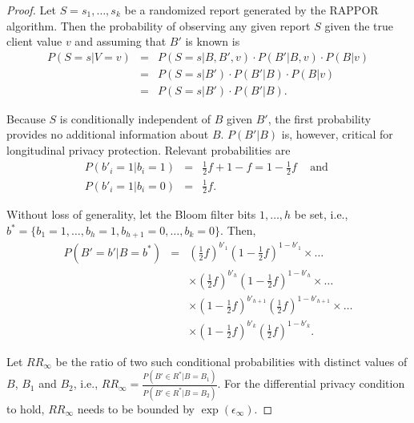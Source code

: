 \documentclass{sig-alternate-2013}
\newcommand\RAPPOR{{RAPPOR}}
\begin{document}
\begin{proof}
Let $S = s_1, \ldots, s_k$ be a randomized report generated by the \RAPPOR{} algorithm. Then the probability of observing any given report $S$ given the true client value $v$ and assuming that $B'$ is known is
\begin{eqnarray*}
P(S = s | V = v) & = & P(S = s | B, B', v)\cdot P(B' | B, v)\cdot P(B | v) \\
                         & = & P(S = s | B')\cdot P(B' | B)\cdot P(B | v) \\
                         & = & P(S = s | B')\cdot P(B' | B).
\end{eqnarray*}

Because $S$ is conditionally independent of $B$ given $B'$, the first probability provides no additional information about $B$. 
$P(B' | B)$ is, however, critical for longitudinal privacy protection. Relevant probabilities are
\begin{eqnarray*}
P(b'_i = 1 | b_i = 1) & = & \frac{1}{2}f + 1 - f = 1 - \frac{1}{2}f \;\;\;\text{~and~}\\
P(b'_i = 1 | b_i = 0) & = & \frac{1}{2}f.
\end{eqnarray*}

Without loss of generality, let the Bloom filter bits $1, \ldots, h$ be set, i.e., $b^* = \{b_1 = 1, \ldots, b_h = 1, b_{h+1} = 0, \ldots, b_{k} = 0\}$. Then,
\begin{eqnarray*}
P(B' = b' | B = b^*) & = & \left(\frac{1}{2}f\right)^{b'_1}\left(1 - \frac{1}{2}f\right)^{1 - b'_1} \times \ldots \\
                   &   & \times \left(\frac{1}{2}f\right)^{b'_h}\left(1 - \frac{1}{2}f\right)^{1 - b'_h} \times \ldots \\
                   &   & \times \left(1 - \frac{1}{2}f\right)^{b'_{h + 1}}\left(\frac{1}{2}f\right)^{1 - b'_{h + 1}} \times \ldots \\
                   &   & \times \left(1 - \frac{1}{2}f\right)^{b'_k}\left(\frac{1}{2}f\right)^{1 - b'_k}.
\end{eqnarray*}

Let $RR_{\infty}$ be the ratio of two such conditional probabilities with distinct values of $B$, $B_1$ and $B_2$, i.e., $RR_{\infty} = \frac{P(B'\in R^* | B = B_1)}{P(B' \in R^* | B = B_2)}$. For the differential privacy condition to hold, $RR_{\infty}$ needs to be bounded by $\exp(\epsilon_{\infty})$.


\end{proof}
\end{document}
